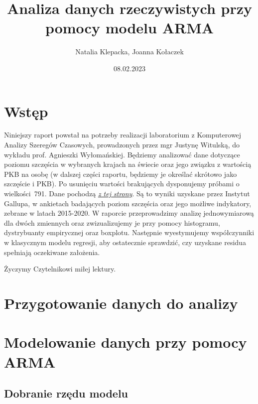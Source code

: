 \documentclass{article}
\title{Analiza danych rzeczywistych przy pomocy modelu ARMA}
\author{Natalia Klepacka, Joanna Kołaczek}
\date{08.02.2023}
\theoremstyle{break}
\begin{document}
	\maketitle
	\tableofcontents
	\clearpage
	\section{Wstęp}
	Niniejszy raport powstał na potrzeby realizacji laboratorium z Komputerowej Analizy Szeregów Czasowych, prowadzonych przez mgr Justynę Witulską, do wykładu prof. Agnieszki Wyłomańskiej.
	Będziemy analizować dane dotyczące poziomu szczęścia w wybranych krajach na świecie oraz jego związku z wartością PKB na osobę (w dalszej części raportu, będziemy je określać skrótowo jako szczęście i PKB). Po usunięciu wartości brakujących dysponujemy próbami o wielkości~791. Dane pochodzą \href{https://www.kaggle.com/datasets/eliasturk/world-happiness-based-on-cpi-20152020}{\textit{z tej strony}}. Są to wyniki uzyskane przez Instytut Gallupa, w ankietach badających poziom szczęścia oraz jego możliwe indykatory, zebrane  w latach 2015-2020. W raporcie przeprowadzimy analizę jednowymiarową dla dwóch zmiennych oraz zwizualizujemy je przy pomocy histogramu, dystrybuanty empirycznej oraz boxplotu. Następnie wyestymujemy współczynniki w klasycznym modelu regresji, aby ostatecznie sprawdzić, czy uzyskane residua spełniają oczekiwane założenia.
	
	Życzymy Czytelnikowi miłej lektury.
	
	\section{Przygotowanie danych do analizy}
	
	\section{Modelowanie danych przy pomocy ARMA}
	
	\subsection{Dobranie rzędu modelu}
	
\end{document}
